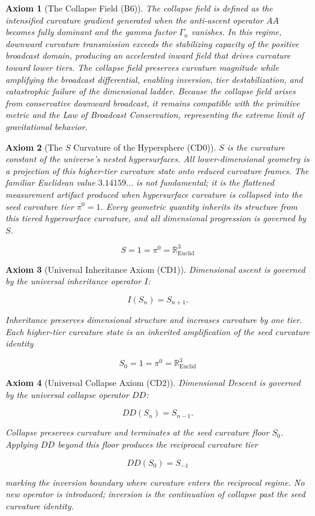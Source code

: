 \documentclass[final,onefignum,onetabnum]{siamart}
\newtheorem{axiom}{Axiom}
\begin{document}
\begin{axiom}[The Collapse Field (B6)]
The collapse field is defined as the intensified curvature gradient generated when the anti-ascent operator $AA$ becomes fully dominant and the gamma factor $\Gamma_{n}$ vanishes. In this regime, downward curvature transmission exceeds the stabilizing capacity of the positive broadcast domain, producing an accelerated inward field that drives curvature toward lower tiers. The collapse field preserves curvature magnitude while amplifying the broadcast differential, enabling inversion, tier destabilization, and catastrophic failure of the dimensional ladder. Because the collapse field arises from conservative downward broadcast, it remains compatible with the primitive metric and the Law of Broadcast Conservation, representing the extreme limit of gravitational behavior.
\end{axiom}

\begin{axiom}[The $S$ Curvature of the Hypersphere (CD0)]
$S$ is the curvature constant of the universe’s nested hypersurfaces. All lower-dimensional geometry is a projection of this higher-tier curvature state onto reduced curvature frames. The familiar Euclidean value $3.14159\ldots$ is not fundamental; it is the flattened measurement artifact produced when hypersurface curvature is collapsed into the seed curvature tier $\pi^{0} = 1$. Every geometric quantity inherits its structure from this tiered hypersurface curvature, and all dimensional progression is governed by $S$.


\[
S = 1 = \pi^0 = \mathbb{R}_{\text{Euclid}}^3
\]

\end{axiom}

\begin{axiom}[Universal Inheritance Axiom (CD1)]
Dimensional ascent is governed by the universal inheritance operator $I$:

\[
I(S_{n}) = S_{n+1}.
\]

Inheritance preserves dimensional structure and increases curvature by one tier. Each higher-tier curvature state is an inherited amplification of the seed curvature identity


\[
S_0 = 1 = \pi^0 = \mathbb{R}_{\text{Euclid}}^3
\]

\end{axiom}


\begin{axiom}[Universal Collapse Axiom (CD2)]
Dimensional Descent is governed by the universal collapse operator $DD$:

\[
DD(S_{n}) = S_{n-1}.
\]


Collapse preserves curvature and terminates at the seed curvature floor $S_0$. Applying $DD$ beyond this floor produces the reciprocal curvature tier


\[
DD(S_0) = S_{-1}
\]


marking the inversion boundary where curvature enters the reciprocal regime. No new operator is introduced; inversion is the continuation of collapse past the seed curvature identity.
\end{axiom}
\end{document}
